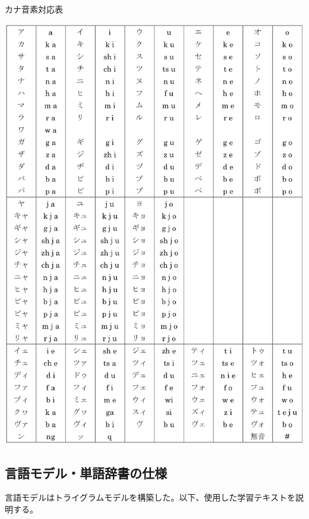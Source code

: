 \begin{table}[H]
  \begin{center}
    \caption{カナ音素対応表 \label{fig:kana_onso}}
    \includegraphics[scale=0.7]{./figure/kana_onso.eps}
  \end{center}
  
\end{table}



\subsection{言語モデル・単語辞書の仕様}
言語モデルはトライグラムモデルを構築した。以下、使用した学習テキストを説明する。

